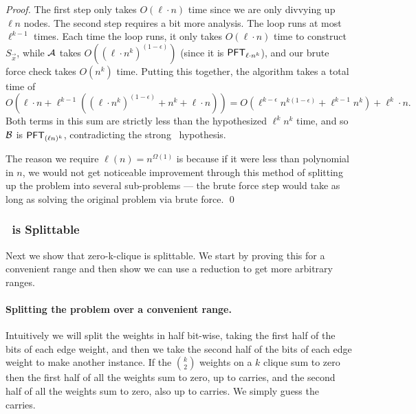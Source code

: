 \begin{proof}
	The first step only takes $O(\ell \cdot n)$ time since we are only divvying up $\ell n$ nodes. The second step requires a bit more analysis. The loop runs at most $\ell^{k-1}$ times. Each time the loop runs, it only takes $O(\ell \cdot n)$ time to construct $S_{\vec x}$, while $\mathcal{A}$ takes $O((\ell \cdot n^{k})^{(1-\epsilon)})$ (since it is $\mathsf{PFT}_{\ell \cdot n^k}$), and our brute force check takes $O(n^k)$ time. Putting this together, the algorithm takes a total time of 
	\[O(\ell \cdot n + \ell^{k-1} ((\ell \cdot n^{k})^{(1-\epsilon)} + n^k + \ell \cdot n) ) = O(\ell^{k-\epsilon}n^{k(1-\epsilon)} + \ell^{k-1}n^{k}) + \ell^k \cdot n.\]
	Both terms in this sum are strictly less than the hypothesized $\ell^k n^k$ time, and so ${\cal B}$ is $\mathsf{PFT}_{(\ell n)^k}$, contradicting the strong \zkclique~hypothesis.
	
	The reason we require $\ell(n) = n^{\Omega(1)}$ is because if it were less than polynomial in $n$, we would not get noticeable improvement through this method of splitting up the problem into several sub-problems --- the brute force step would take as long as solving the original problem via brute force.
	\qed
\end{proof}


\subsubsection{\zkclique~is Splittable}
Next we show that zero-k-clique is splittable. We start by proving this for a convenient range and then show we can use a reduction to get more arbitrary ranges. 

\paragraph{Splitting the problem over a convenient range.} Intuitively we will split the weights in half bit-wise, taking the first half of the bits of each edge weight, and then we take the second half of the bits of each edge weight to make another instance. If the $\binom{k}{2}$ weights on a $k$ clique sum to zero then the first half of all the weights sum to zero, up to carries, and the second half of all the weights sum to zero, also up to carries. We simply guess the carries. 

\newcommand{\high}[1]{{#1}^\uparrow}
\newcommand{\low}[1]{{#1}_\downarrow}
\newcommand{\ZkC}{\mathrm{Z}$k$\mathrm{C}}

